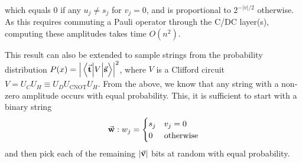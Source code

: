 which equals $0$ if any $u_{j}\neq s_{j}$ for $v_{j}=0$, and is proportional to $2^{-\left\vert v\right\vert/2}$ otherwise. As this requires commuting a Pauli operator through the C/DC layer(s), computing these amplitudes takes time $O(n^{2})$.\par
This result can also be extended to sample strings from the probability distribution $P(x)=\left\vert\matrixel{\va{t}}{V}{\va{s}}\right\vert^{2}$, where $V$ is a Clifford circuit $V=U_{C}U_{H}\equiv U_{D}U_{\text{CNOT}}U_{H}$. From the above, we know that any string with a non-zero amplitude occurs with equal probability. This, it is sufficient to start with a binary string
\[\va{w}:w_{j}=\begin{cases}s_{j} & v_{j}=0 \\ 0 & \text{otherwise}\end{cases}\]
and then pick each of the remaining $\left\vert \va{v}\right\vert$ bits at random with equal probability.
